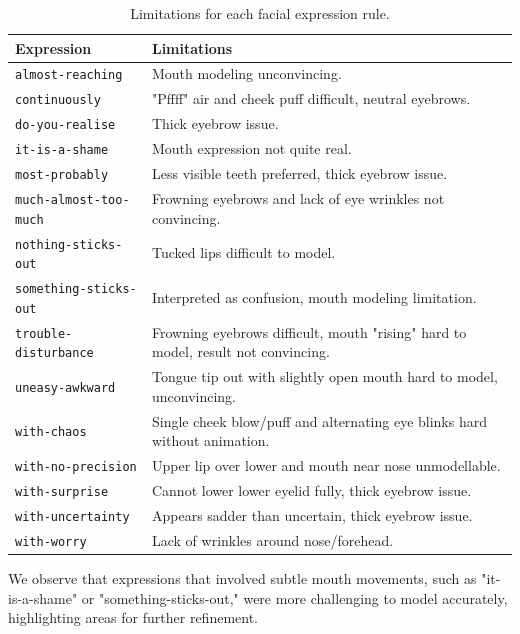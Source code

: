 \documentclass[../../main]{subfiles}
\begin{document}
\begin{table}
    \centering
    \begin{tabular}{|l|p{8cm}|}
    \hline
    \textbf{Expression} & \textbf{Limitations} \\
    \hline
    \texttt{almost-reaching} & Mouth modeling unconvincing. \\
    \hline
    \texttt{continuously} & "Pffff" air and cheek puff difficult, neutral eyebrows. \\
    \hline
    \texttt{do-you-realise} & Thick eyebrow issue. \\
    \hline
    \texttt{it-is-a-shame} & Mouth expression not quite real. \\
    \hline
    \texttt{most-probably} & Less visible teeth preferred, thick eyebrow issue. \\
    \hline
    \texttt{much-almost-too-much} & Frowning eyebrows and lack of eye wrinkles not convincing. \\
    \hline
    \texttt{nothing-sticks-out} & Tucked lips difficult to model. \\
    \hline
   \texttt{something-sticks-out} & Interpreted as confusion, mouth modeling limitation. \\
    \hline
    \texttt{trouble-disturbance} & Frowning eyebrows difficult, mouth "rising" hard to model, result not convincing. \\
    \hline
    \texttt{uneasy-awkward} & Tongue tip out with slightly open mouth hard to model, unconvincing. \\
    \hline
    \texttt{with-chaos} & Single cheek blow/puff and alternating eye blinks hard without animation. \\
    \hline
    \texttt{with-no-precision} & Upper lip over lower and mouth near nose unmodellable. \\
    \hline
    \texttt{with-surprise} & Cannot lower lower eyelid fully, thick eyebrow issue. \\
    \hline
    \texttt{with-uncertainty} & Appears sadder than uncertain, thick eyebrow issue. \\
    \hline
    \texttt{with-worry} & Lack of wrinkles around nose/forehead. \\
    \hline
    \end{tabular}
    \caption{Limitations for each facial expression rule.}
    \label{tab:facial_expressions_evaluation}
\end{table}

We observe that expressions that involved subtle mouth movements, such as "it-is-a-shame" or "something-sticks-out," were more challenging to model accurately, highlighting areas for further refinement.
\end{document}
